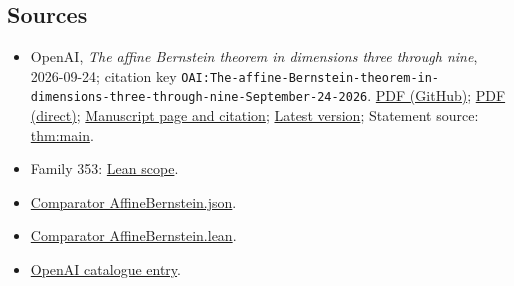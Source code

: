 \documentclass[11pt]{article}
\begin{document}
\subsection{Sources}
\begin{itemize}
\item OpenAI, \emph{The affine Bernstein theorem in dimensions three through nine}, 2026-09-24; citation key \texttt{OAI:The-affine-Bernstein-theorem-in-dimensions-three-through-nine-September-24-2026}. \href{https://github.com/openai/math/blob/adc7f1241b42e322a6451854ab7e4b4c146bf78a/preprints/The-affine-Bernstein-theorem-in-dimensions-three-through-nine-September-24-2026/main.pdf}{PDF (GitHub)}; \href{https://github.com/openai/math/raw/adc7f1241b42e322a6451854ab7e4b4c146bf78a/preprints/The-affine-Bernstein-theorem-in-dimensions-three-through-nine-September-24-2026/main.pdf}{PDF (direct)}; \href{https://github.com/openai/math/blob/adc7f1241b42e322a6451854ab7e4b4c146bf78a/preprints/The-affine-Bernstein-theorem-in-dimensions-three-through-nine-September-24-2026/README.md}{Manuscript page and citation}; \href{https://github.com/openai/math/blob/main/preprints/The-affine-Bernstein-theorem-in-dimensions-three-through-nine-September-24-2026/main.pdf}{Latest version}; Statement source: \href{https://github.com/openai/math/blob/adc7f1241b42e322a6451854ab7e4b4c146bf78a/preprints/The-affine-Bernstein-theorem-in-dimensions-three-through-nine-September-24-2026/build/main.tex\#L82}{thm:main}.
\item Family 353: \href{https://github.com/openai/math/blob/adc7f1241b42e322a6451854ab7e4b4c146bf78a/lean/docs/353.md}{Lean scope}.
\item \href{https://github.com/openai/math/blob/adc7f1241b42e322a6451854ab7e4b4c146bf78a/lean/ComparatorChallenges/AffineBernstein.json}{Comparator AffineBernstein.json}.
\item \href{https://github.com/openai/math/blob/adc7f1241b42e322a6451854ab7e4b4c146bf78a/lean/ComparatorChallenges/AffineBernstein.lean}{Comparator AffineBernstein.lean}.
\item \href{https://github.com/openai/math/blob/adc7f1241b42e322a6451854ab7e4b4c146bf78a/CONTENTS.md}{OpenAI catalogue entry}.
\end{itemize}
\end{document}
